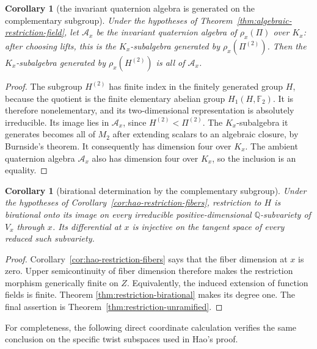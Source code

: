 \documentclass[11pt,reqno]{amsart}
\newtheorem{corollary}[theorem]{Corollary}
\theoremstyle{definition}
\theoremstyle{remark}
\newcommand{\Q}{\mathbb Q}
\begin{document}
\begin{corollary}[the invariant quaternion algebra is generated on the
complementary subgroup]
\label{cor:algebra-generated-on-H}
Under the hypotheses of
Theorem~\ref{thm:algebraic-restriction-field}, let
\(\mathcal A_x\) be the invariant quaternion algebra of
\(\rho_x(\Pi)\) over \(K_x\): after choosing lifts, this is the
\(K_x\)-subalgebra generated by \(\rho_x(\Pi^{(2)})\).  Then the
\(K_x\)-subalgebra generated by \(\rho_x(H^{(2)})\) is all of
\(\mathcal A_x\).
\end{corollary}

\begin{proof}
The subgroup \(H^{(2)}\) has finite index in the finitely generated group
\(H\), because the quotient is the finite elementary abelian group
\(H_1(H,\mathbb F_2)\).  It is therefore nonelementary, and its
two-dimensional representation is absolutely irreducible.  Its image lies
in \(\mathcal A_x\), since \(H^{(2)}<\Pi^{(2)}\).  The
\(K_x\)-subalgebra it generates becomes all of \(M_2\) after extending
scalars to an algebraic closure, by Burnside's theorem.  It consequently
has dimension four over \(K_x\).  The ambient quaternion algebra
\(\mathcal A_x\) also has dimension four over \(K_x\), so the inclusion
is an equality.
\end{proof}

\begin{corollary}[birational determination by the complementary subgroup]
\label{cor:hao-birational}
Under the hypotheses of
Corollary~\ref{cor:hao-restriction-fibers}, restriction to \(H\) is
birational onto its image on every irreducible positive-dimensional
\(\Q\)-subvariety of \(V_x\) through \(x\).  Its differential at \(x\)
is injective on the tangent space of every reduced such subvariety.
\end{corollary}

\begin{proof}
Corollary~\ref{cor:hao-restriction-fibers} says that the fiber dimension at
\(x\) is zero.  Upper semicontinuity of fiber dimension therefore makes the
restriction morphism generically finite on \(Z\).  Equivalently, the induced
extension of function fields is finite.  Theorem
\ref{thm:restriction-birational} makes its degree one.  The final assertion
is Theorem~\ref{thm:restriction-unramified}.
\end{proof}

For completeness, the following direct coordinate calculation verifies the
same conclusion on the specific twist subspaces used in Hao's proof.
\end{document}
